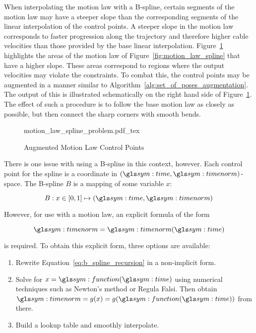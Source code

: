 	When interpolating the motion law with a B-spline, certain segments of the
	motion law may have a steeper slope than the corresponding segments of the
	linear interpolation of the control points. A steeper slope in the motion
	law corresponds to faster progression along the trajectory and therefore
	higher cable velocities than those provided by the base linear
	interpolation.  Figure~\ref{fig:augmented_motion_law_control_points}
	highlights the areas of the motion law of Figure~\ref{fig:motion_law_spline}
	that have a higher slope. These areas correspond to regions where the output
	velocities may violate the constraints. To combat this, the control points
	may be augmented in a manner similar to
	Algorithm~\ref{alg:set_of_poses_augmentation}. The output of this is
	illustrated schematically on the right hand side of
	Figure~\ref{fig:augmented_motion_law_control_points}. The effect of such a
	procedure is to follow the base motion law as closely as possible, but then
	connect the sharp corners with smooth bends.

	\begin{figure}[hb]
		\centering
		\def\svgwidth{\textwidth}
		{motion_law_spline_problem.pdf_tex}
		\caption{Augmented Motion Law Control Points}%
		\label{fig:augmented_motion_law_control_points}
	\end{figure}

	There is one issue with using a B-spline in this context, however. Each
	control point for the spline is a coordinate in
	\(
		\left(
			\timesym, \timenorm
		\right)
	\)-space. The B-spline $B$ is a mapping of some variable $x$:

	\begin{equation}
		B: x \in [0, 1] \mapsto \left(\timesym, \timenorm\right)
	\end{equation}

	However, for use with a motion law, an explicit formula of the form

	\begin{equation}
		\timenorm = \timenorm(\timesym)
		\label{eq:direct_relation_motion_law_spline}
	\end{equation}

	is required. To obtain this explicit form, three options are available:

	\begin{enumerate}

		\item

			Rewrite Equation~\ref{eq:b_spline_recursion} in a non-implicit form.
			\label{option:rewrite_non_implicit}

		\item

			Solve for
			\(
				x = \function(\timesym)
			\)
			using numerical techniques such as Newton's method or Regula
			Falsi. Then obtain
			\(
				\timenorm = g(x) = g(\function(\timesym))
			\)
			from there.
			\label{option:solve_numerically}

		\item

			Build a lookup table and smoothly interpolate.
			\label{option:lookup_table}

	\end{enumerate}

